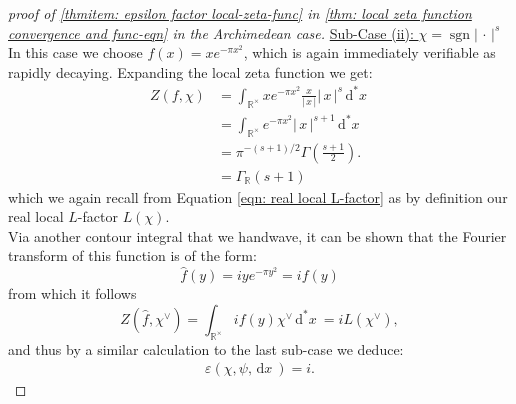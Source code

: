 \documentclass[11pt, x11names]{book}
\newcommand{\rr}{\mathbb{R}}
\renewcommand{\brack}[1]{\left(   #1 \right)}
\newcommand{\abs}[1]{\left| \, #1  \,\right|}
\renewcommand{\hat}{\widehat}
\DeclareMathOperator{\sgn}{sgn}
\newcommand{\dx}{\, \mathrm{d}x \ }
\renewcommand{\d}[1]{\, \mathrm{d}#1 \ }
\begin{document}
\begin{proof}[proof of \ref{thmitem: epsilon factor local-zeta-func} in \ref{thm: local zeta function convergence and func-eqn} in the Archimedean case]
\underline{Sub-Case (ii): $\chi = \sgn \abs{\cdot}^s$}\\
In this case we choose $f(x) = xe^{-\pi x^2}$, which is again immediately verifiable as rapidly decaying. Expanding the local zeta function we get:
\begin{align*}
    Z(f, \chi) &= \int_{\rr^\times} x e^{-\pi x^2} \frac{x}{\abs{x}} \abs{x}^s \d{^*x}\\
    &= \int_{\rr^\times} e^{-\pi x^2} \abs{x}^{s+1} \d{^*x}\\
    &= \pi^{-(s+1)/2} \Gamma\brack{\frac{s+1}{2}}.\\
    &= \Gamma_\rr(s+1)
\end{align*}
which we again recall from Equation \ref{eqn: real local L-factor} as by definition our real local $L$-factor $L(\chi)$.\\
Via another contour integral that we handwave, it can be shown that the Fourier transform of this function is of the form:
\begin{equation*}
    \hat{f}(y) = i y e^{- \pi y^2 } = i f(y)
\end{equation*} 
from which it follows 
\begin{equation*}
    Z(\hat{f}, \chi^\lor) = \int_{\rr^\times} i f(y) \chi^\lor \d{^*x} = i L(\chi^\lor),
\end{equation*}
and thus by a similar calculation to the last sub-case we deduce:
\begin{align}
\label{eqn: real epsilon factor 2}
    \varepsilon(\chi, \psi, \dx) = i.
\end{align}


\end{proof}
\end{document}
